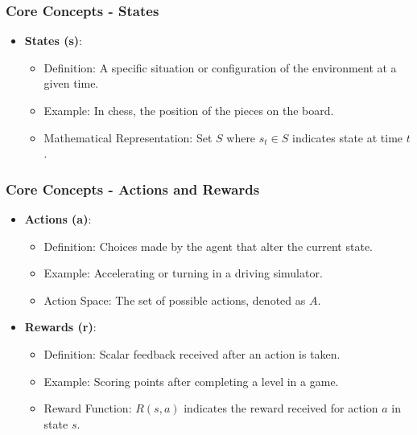 \documentclass[aspectratio=169]{beamer}
\begin{document}
\begin{frame}[fragile]
    \frametitle{Core Concepts - States}
    \begin{itemize}
        \item \textbf{States (s)}:
        \begin{itemize}
            \item Definition: A specific situation or configuration of the environment at a given time.
            \item Example: In chess, the position of the pieces on the board.
            \item Mathematical Representation: Set \( S \) where \( s_t \in S \) indicates state at time \( t \).
        \end{itemize}
    \end{itemize}
\end{frame}

\begin{frame}[fragile]
    \frametitle{Core Concepts - Actions and Rewards}
    \begin{itemize}
        \item \textbf{Actions (a)}:
        \begin{itemize}
            \item Definition: Choices made by the agent that alter the current state.
            \item Example: Accelerating or turning in a driving simulator.
            \item Action Space: The set of possible actions, denoted as \( A \).
        \end{itemize}

        \item \textbf{Rewards (r)}:
        \begin{itemize}
            \item Definition: Scalar feedback received after an action is taken.
            \item Example: Scoring points after completing a level in a game.
            \item Reward Function: \( R(s, a) \) indicates the reward received for action \( a \) in state \( s \).
        \end{itemize}
    \end{itemize}
\end{frame}
\end{document}
